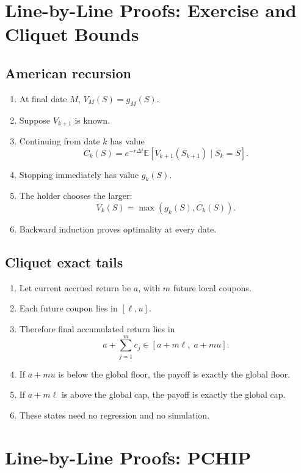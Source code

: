 \documentclass[11pt,oneside]{book}
\theoremstyle{definition}
\newenvironment{proofsteps}
{\begin{enumerate}[label=\textbf{Line \arabic*.}, itemsep=0.35em]}
{\end{enumerate}}
\newcommand{\E}{\mathbb{E}}
\begin{document}
\chapter{Line-by-Line Proofs: Exercise and Cliquet Bounds}

\section{American recursion}
\begin{proofsteps}
\item At final date \(M\), \(V_M(S)=g_M(S)\).
\item Suppose \(V_{k+1}\) is known.
\item Continuing from date \(k\) has value
\[
C_k(S)=e^{-r\Delta t}\E[V_{k+1}(S_{k+1})\mid S_k=S].
\]
\item Stopping immediately has value \(g_k(S)\).
\item The holder chooses the larger:
\[
V_k(S)=\max(g_k(S),C_k(S)).
\]
\item Backward induction proves optimality at every date.
\end{proofsteps}

\section{Cliquet exact tails}
\begin{proofsteps}
\item Let current accrued return be \(a\), with \(m\) future local coupons.
\item Each future coupon lies in \([\ell,u]\).
\item Therefore final accumulated return lies in
\[
a+\sum_{j=1}^m c_j \in [a+m\ell,\;a+mu].
\]
\item If \(a+mu\) is below the global floor, the payoff is exactly the global floor.
\item If \(a+m\ell\) is above the global cap, the payoff is exactly the global cap.
\item These states need no regression and no simulation.
\end{proofsteps}

\chapter{Line-by-Line Proofs: PCHIP}
\end{document}
